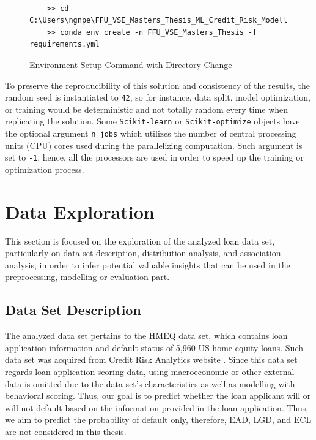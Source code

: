 \begin{figure}[H]
    \centering\caption{Environment Setup Command with Directory Change}
    \label{fig:envsetupcd}
\centering\
{\footnotesize
\begin{verbatim}
    >> cd C:\Users\ngnpe\FFU_VSE_Masters_Thesis_ML_Credit_Risk_Modelling
    >> conda env create -n FFU_VSE_Masters_Thesis -f requirements.yml   
\end{verbatim}
}

\vspace{0em}
\end{figure}


To preserve the reproducibility of this solution and consistency of the results, the random seed is instantiated to \texttt{42}, so for instance, data split, model optimization, or training would be deterministic and not totally random every time when replicating the solution.
Some \lstinline{Scikit-learn} or \lstinline{Scikit-optimize} objects have the optional argument \texttt{n\_jobs} which utilizes the number of central processing units (CPU) cores used during the parallelizing computation. Such argument is set to \texttt{-1}, hence, all the processors are used in order to speed up the training or optimization process.


\newpage
\section{Data Exploration}
\label{sec:dataexploration}
This section is focused on the exploration of the analyzed loan data set, particularly on data set description, distribution analysis, and association analysis, in order to infer potential valuable insights that can be used in the preprocessing, modelling or evaluation part.

\subsection{Data Set Description}
\label{subsec:datadescript}
The analyzed data set pertains to the HMEQ data set, which contains loan application information and default status of 5,960 US home equity loans. Such data set was acquired from Credit Risk Analytics website \citep{baesens2016credit}. Since this data set regards loan application scoring data, using macroeconomic or other external data is omitted due to the data set's characteristics as well as modelling with behavioral scoring.
Thus, our goal is to predict whether the loan applicant will or will not default based on the information provided in the loan application.
Thus, we aim to predict the probability of default only, therefore, EAD, LGD, and ECL are not considered in this thesis.

